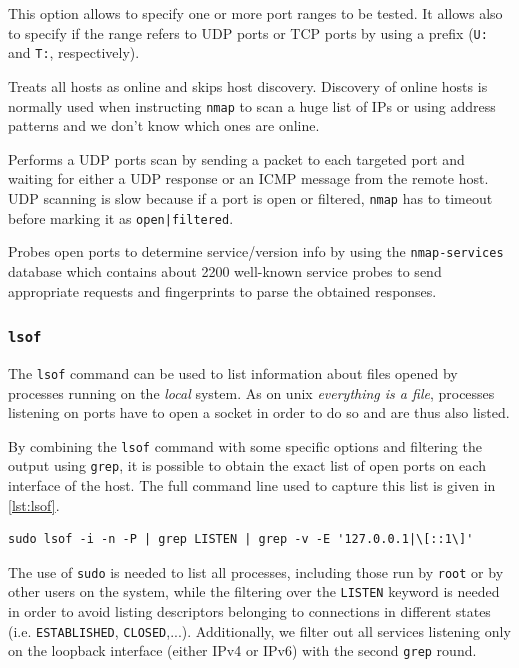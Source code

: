 \documentclass[10pt,a4paper,twoside,onecolumn]{article}
\begin{document}
\begin{description}[style=multiline,leftmargin=1cm]
	\item[\texttt{-p}] This option allows to specify one or more port ranges to be tested. It allows also to specify if the range refers to UDP ports or TCP ports by using a prefix (\texttt{U:} and \texttt{T:}, respectively).
	\item[\texttt{-PN}] Treats all hosts as online and skips host discovery. Discovery of online hosts is normally used when instructing \texttt{nmap} to scan a huge list of IPs or using address patterns and we don't know which ones are online.
	\item[\texttt{-sU}] Performs a UDP ports scan by sending a packet to each targeted port and waiting for either a UDP response or an ICMP message from the remote host. UDP scanning is slow because if a port is open or filtered, \texttt{nmap} has to timeout before marking it as \texttt{open|filtered}.
	\item[\texttt{-sV}] Probes open ports to determine service/version info by using the \texttt{nmap-services} database which contains about 2200 well-known service probes to send appropriate requests and fingerprints to parse the obtained responses.
\end{description}

\subsubsection{\texttt{lsof}}
\label{sec:lsof}

The \texttt{lsof} command can be used to list information about files opened by processes running on the \emph{local} system. As on unix \emph{everything is a file}, processes listening on ports have to open a socket in order to do so and are thus also listed.

By combining the \texttt{lsof} command with some specific options and filtering the output using \texttt{grep}, it is possible to obtain the exact list of open ports on each interface of the host. The full command line used to capture this list is given in \autoref{lst:lsof}.

\lstset{language=bash,caption=Complete shell command to list open ports,label=lst:lsof,numbers=none}
\begin{lstlisting}
sudo lsof -i -n -P | grep LISTEN | grep -v -E '127.0.0.1|\[::1\]'
\end{lstlisting}

The use of \texttt{sudo} is needed to list all processes, including those run by \texttt{root} or by other users on the system, while the filtering over the \texttt{LISTEN} keyword is needed in order to avoid listing descriptors belonging to connections in different states (i.e. \texttt{ESTABLISHED}, \texttt{CLOSED},...). Additionally, we filter out all services listening only on the loopback interface (either IPv4 or IPv6) with the second \texttt{grep} round.
\end{document}
